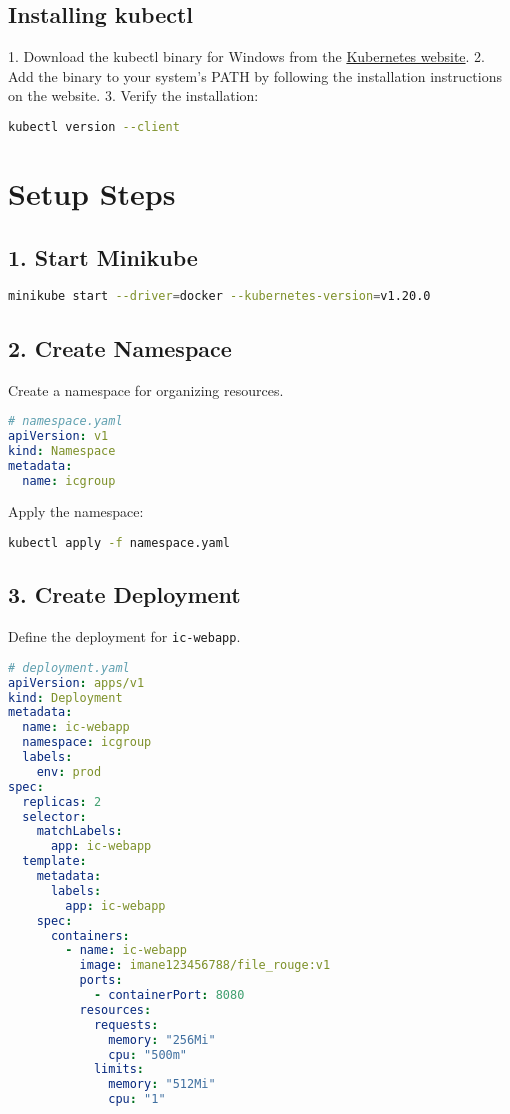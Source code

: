\documentclass{article}
\begin{document}
\subsection*{Installing kubectl}
1. Download the kubectl binary for Windows from the \href{https://kubernetes.io/docs/tasks/tools/install-kubectl-windows/}{Kubernetes website}.
2. Add the binary to your system's PATH by following the installation instructions on the website.
3. Verify the installation:
   \begin{lstlisting}[language=bash]
   kubectl version --client
   \end{lstlisting}

\section*{Setup Steps}

\subsection*{1. Start Minikube}
\begin{lstlisting}[language=bash]
minikube start --driver=docker --kubernetes-version=v1.20.0
\end{lstlisting}

\subsection*{2. Create Namespace}
Create a namespace for organizing resources.
\begin{lstlisting}[language=yaml]
# namespace.yaml
apiVersion: v1
kind: Namespace
metadata:
  name: icgroup
\end{lstlisting}

Apply the namespace:
\begin{lstlisting}[language=bash]
kubectl apply -f namespace.yaml
\end{lstlisting}

\subsection*{3. Create Deployment}
Define the deployment for \texttt{ic-webapp}.
\begin{lstlisting}[language=yaml]
# deployment.yaml
apiVersion: apps/v1
kind: Deployment
metadata:
  name: ic-webapp
  namespace: icgroup
  labels:
    env: prod
spec:
  replicas: 2
  selector:
    matchLabels:
      app: ic-webapp
  template:
    metadata:
      labels:
        app: ic-webapp
    spec:
      containers:
        - name: ic-webapp
          image: imane123456788/file_rouge:v1
          ports:
            - containerPort: 8080
          resources:
            requests:
              memory: "256Mi"
              cpu: "500m"
            limits:
              memory: "512Mi"
              cpu: "1"
\end{lstlisting}
\end{document}
